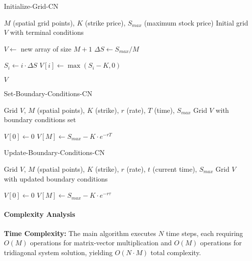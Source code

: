 \documentclass[12pt,a4paper]{article}
\numberwithin{algorithm}{subsection}
\begin{document}
\begin{algorithm}[H]
\caption{Initialize-Grid-CN}
\begin{algorithmic}[1]
\REQUIRE $M$ (spatial grid points), $K$ (strike price), $S_{max}$ (maximum stock price)
\ENSURE Initial grid $V$ with terminal conditions

\STATE $V \leftarrow$ new array of size $M+1$
\STATE $\Delta S \leftarrow S_{max} / M$

    \STATE $S_i \leftarrow i \cdot \Delta S$
    \STATE $V[i] \leftarrow \max(S_i - K, 0)$ 
\ENDFOR

\RETURN $V$
\end{algorithmic}
\end{algorithm}

\begin{algorithm}[H]
\caption{Set-Boundary-Conditions-CN}
\begin{algorithmic}[1]
\REQUIRE Grid $V$, $M$ (spatial points), $K$ (strike), $r$ (rate), $T$ (time), $S_{max}$
\ENSURE Grid $V$ with boundary conditions set

\STATE $V[0] \leftarrow 0$ 
\STATE $V[M] \leftarrow S_{max} - K \cdot e^{-rT}$ 
\end{algorithmic}
\end{algorithm}

\begin{algorithm}[H]
\caption{Update-Boundary-Conditions-CN}
\begin{algorithmic}[1]
\REQUIRE Grid $V$, $M$ (spatial points), $K$ (strike), $r$ (rate), $t$ (current time), $S_{max}$
\ENSURE Grid $V$ with updated boundary conditions

\STATE $V[0] \leftarrow 0$ 
\STATE $V[M] \leftarrow S_{max} - K \cdot e^{-r\tau}$ 
\end{algorithmic}
\end{algorithm}

\paragraph{Complexity Analysis}

\textbf{Time Complexity:} The main algorithm executes $N$ time steps, each requiring $O(M)$ operations for matrix-vector multiplication and $O(M)$ operations for tridiagonal system solution, yielding $O(N \cdot M)$ total complexity.
\end{document}
